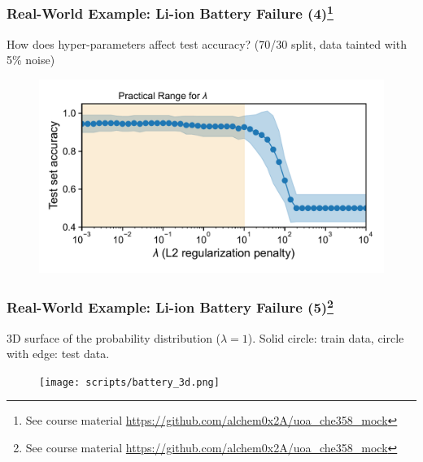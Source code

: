\documentclass[10pt,aspectratio=169]{beamer}
\begin{document}
      \begin{frame}
        \frametitle{Real-World Example: Li-ion Battery Failure
          (4)\let\thefootnote\relax\footnote{{\scriptsize See course
              material
              \url{https://github.com/alchem0x2A/uoa_che358_mock}}}}

        How does hyper-parameters affect test accuracy? (70/30 split,
        data tainted with 5\% noise)

        \begin{figure}
          \vspace*{-0.05\textheight}%
          \includegraphics[width=\textwidth]{scripts/batter_hyper.pdf}
        \end{figure}
        
        
      \end{frame}

      \begin{frame}
        \frametitle{Real-World Example: Li-ion Battery Failure
          (5)\let\thefootnote\relax\footnote{{\scriptsize See course
              material
              \url{https://github.com/alchem0x2A/uoa_che358_mock}}}}

        3D surface of the probability distribution ($\lambda =
        1$). Solid circle: train data, circle with edge: test data.

        \begin{figure}
          \vspace*{-0.20\textheight}%
          \texttt{[image: scripts/battery\_3d.png]}
        \end{figure}
        
        
      \end{frame}
\end{document}

